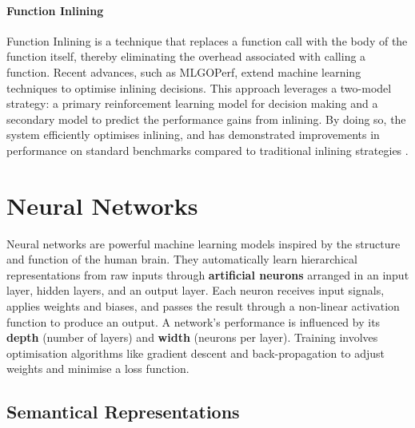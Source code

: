 \paragraph{Function Inlining} Function Inlining is a technique that replaces a function call with the body of the function itself, thereby eliminating the overhead associated with calling a function. Recent advances, such as MLGOPerf, extend machine learning techniques to optimise inlining decisions. This approach leverages a two-model strategy: a primary reinforcement learning model for decision making and a secondary model to predict the performance gains from inlining. By doing so, the system efficiently optimises inlining, and has demonstrated improvements in performance on standard benchmarks compared to traditional inlining strategies \cite{FunctionInliningML}.

\section{Neural Networks} \label{Background:NeuralNetworks}
Neural networks are powerful machine learning models inspired by the structure and function of the human brain. They automatically learn hierarchical representations from raw inputs through \textbf{artificial neurons} arranged in an input layer, hidden layers, and an output layer. Each neuron receives input signals, applies weights and biases, and passes the result through a non-linear activation function to produce an output. A network's performance is influenced by its \textbf{depth} (number of layers) and \textbf{width} (neurons per layer). Training involves optimisation algorithms like gradient descent and back-propagation to adjust weights and minimise a loss function.

\subsection{Semantical Representations} \label{subsection:SemanticalRepresentations}


